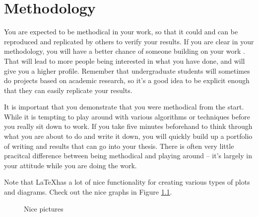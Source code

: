 \chapter{Methodology}

You are expected to be methodical in your work, so that it could and can be
reproduced and replicated by others to verify your results.
If you are clear in your methodology, you will have a better chance of someone
building on your work \cite{villaneuva18}.
That will lead to more people being interested in what you have done, and will
give you a higher profile.
Remember that undergraduate students will sometimes do projects based on
academic research, so it's a good idea to be explicit enough that they can
easily replicate your results.

It is important that you demonstrate that you were methodical from the start.
While it is tempting to play around with various algorithms or techniques
before you really sit down to work.
If you take five minutes beforehand to think through what you are about to do
and write it down, you will quickly build up a portfolio of writing and results
that can go into your thesis.
There is often very little pracitcal difference between being methodical and
playing around -- it's largely in your attitude while you are doing the work.

Note that \LaTeX has a lot of nice functionality for creating various types of
plots and diagrams.
Check out the nice graphs in Figure \ref{tikz:graphs}.

\lipsum[26]

\begin{figure}[ht]
  \centering
  \hspace{1.5cm}
  \caption{Nice pictures}
  \label{tikz:graphs}
\end{figure}

\lipsum[26-28]